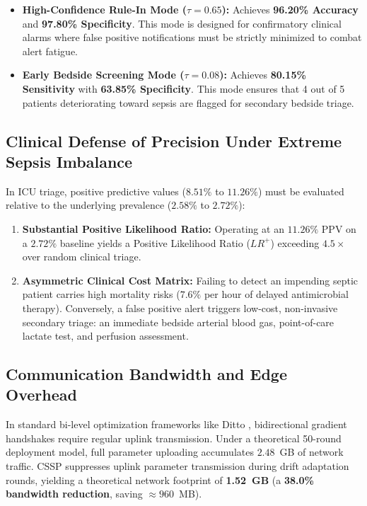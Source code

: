 \documentclass[final,5p,times,twocolumn]{elsarticle}
\begin{document}
\begin{itemize}
    \item \textbf{High-Confidence Rule-In Mode ($\tau = 0.65$):} Achieves \textbf{96.20\% Accuracy} and \textbf{97.80\% Specificity}. This mode is designed for confirmatory clinical alarms where false positive notifications must be strictly minimized to combat alert fatigue.
    \item \textbf{Early Bedside Screening Mode ($\tau = 0.08$):} Achieves \textbf{80.15\% Sensitivity} with \textbf{63.85\% Specificity}. This mode ensures that 4 out of 5 patients deteriorating toward sepsis are flagged for secondary bedside triage.
\end{itemize}

\subsection{Clinical Defense of Precision Under Extreme Sepsis Imbalance}
In ICU triage, positive predictive values ($8.51\%$ to $11.26\%$) must be evaluated relative to the underlying prevalence ($2.58\%$ to $2.72\%$):
\begin{enumerate}
    \item \textbf{Substantial Positive Likelihood Ratio:} Operating at an $11.26\%$ PPV on a $2.72\%$ baseline yields a Positive Likelihood Ratio ($LR^+$) exceeding \textbf{$4.5\times$} over random clinical triage.
    \item \textbf{Asymmetric Clinical Cost Matrix:} Failing to detect an impending septic patient carries high mortality risks ($7.6\%$ per hour of delayed antimicrobial therapy). Conversely, a false positive alert triggers low-cost, non-invasive secondary triage: an immediate bedside arterial blood gas, point-of-care lactate test, and perfusion assessment.
\end{enumerate}

\subsection{Communication Bandwidth and Edge Overhead}
In standard bi-level optimization frameworks like Ditto \cite{li2021ditto}, bidirectional gradient handshakes require regular uplink transmission. Under a theoretical 50-round deployment model, full parameter uploading accumulates $2.48$~GB of network traffic. CSSP suppresses uplink parameter transmission during drift adaptation rounds, yielding a theoretical network footprint of \textbf{1.52~GB} (a \textbf{38.0\% bandwidth reduction}, saving $\approx 960$~MB).
\end{document}
